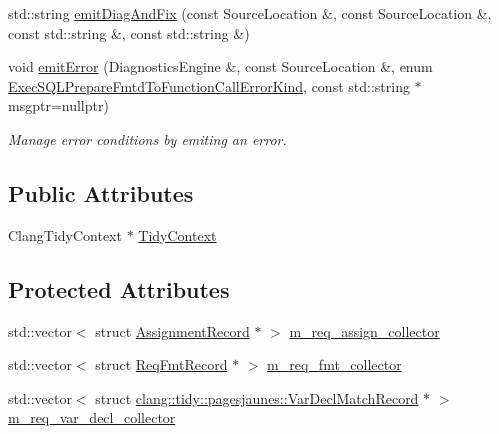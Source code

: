 \begin{DoxyCompactItemize}
std\+::string \hyperlink{classclang_1_1tidy_1_1pagesjaunes_1_1_exec_s_q_l_prepare_fmtd_to_function_call_a384f21a310396151c6f01d282e0e484a}{emit\+Diag\+And\+Fix} (const Source\+Location \&, const Source\+Location \&, const std\+::string \&, const std\+::string \&)
\item 
void \hyperlink{classclang_1_1tidy_1_1pagesjaunes_1_1_exec_s_q_l_prepare_fmtd_to_function_call_af3eaf79180a774629667e46f74960c7f}{emit\+Error} (Diagnostics\+Engine \&, const Source\+Location \&, enum \hyperlink{classclang_1_1tidy_1_1pagesjaunes_1_1_exec_s_q_l_prepare_fmtd_to_function_call_ae929b6e847a469443d23e4036a3e56ab}{Exec\+S\+Q\+L\+Prepare\+Fmtd\+To\+Function\+Call\+Error\+Kind}, const std\+::string $\ast$msgptr=nullptr)
\begin{DoxyCompactList}\small\item\em Manage error conditions by emiting an error. \end{DoxyCompactList}\end{DoxyCompactItemize}
\subsection*{Public Attributes}
\begin{DoxyCompactItemize}
\item 
Clang\+Tidy\+Context $\ast$ \hyperlink{classclang_1_1tidy_1_1pagesjaunes_1_1_exec_s_q_l_prepare_fmtd_to_function_call_a6805b036cc8249bf324332bed7aa8d30}{Tidy\+Context}
\end{DoxyCompactItemize}
\subsection*{Protected Attributes}
\begin{DoxyCompactItemize}
\item 
std\+::vector$<$ struct \hyperlink{structclang_1_1tidy_1_1pagesjaunes_1_1_exec_s_q_l_prepare_fmtd_to_function_call_1_1_assignment_record}{Assignment\+Record} $\ast$ $>$ \hyperlink{classclang_1_1tidy_1_1pagesjaunes_1_1_exec_s_q_l_prepare_fmtd_to_function_call_a1a07a6d793e91f3d8ae9c841b0bc15ae}{m\+\_\+req\+\_\+assign\+\_\+collector}
\item 
std\+::vector$<$ struct \hyperlink{structclang_1_1tidy_1_1pagesjaunes_1_1_exec_s_q_l_prepare_fmtd_to_function_call_1_1_req_fmt_record}{Req\+Fmt\+Record} $\ast$ $>$ \hyperlink{classclang_1_1tidy_1_1pagesjaunes_1_1_exec_s_q_l_prepare_fmtd_to_function_call_a55d577cce8245b3abec0d9440c1891dd}{m\+\_\+req\+\_\+fmt\+\_\+collector}
\item 
std\+::vector$<$ struct \hyperlink{structclang_1_1tidy_1_1pagesjaunes_1_1_var_decl_match_record}{clang\+::tidy\+::pagesjaunes\+::\+Var\+Decl\+Match\+Record} $\ast$ $>$ \hyperlink{classclang_1_1tidy_1_1pagesjaunes_1_1_exec_s_q_l_prepare_fmtd_to_function_call_a8c7a6416204a8a5b313bd8687cc96fb4}{m\+\_\+req\+\_\+var\+\_\+decl\+\_\+collector}
\end{DoxyCompactItemize}


